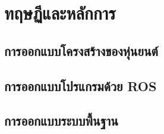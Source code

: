 \chapter{ทฤษฏีและหลักการ}





\clearpage
\section{การออกแบบโครงสร้างของหุ่นยนต์}


\section{การออกแบบโปรแกรมด้วย ROS}


\clearpage

\section{การออกแบบระบบพื้นฐาน}

